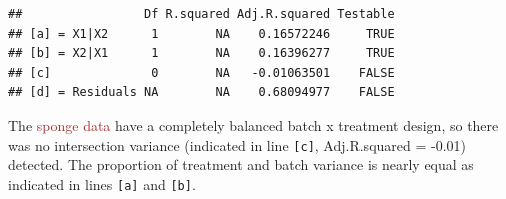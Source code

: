 \documentclass[
]{book}
\newenvironment{Shaded}{\begin{snugshade}}{\end{snugshade}}
\newcommand{\AttributeTok}[1]{\textcolor[rgb]{0.77,0.63,0.00}{#1}}
\newcommand{\CommentTok}[1]{\textcolor[rgb]{0.56,0.35,0.01}{\textit{#1}}}
\newcommand{\ConstantTok}[1]{\textcolor[rgb]{0.00,0.00,0.00}{#1}}
\newcommand{\FunctionTok}[1]{\textcolor[rgb]{0.00,0.00,0.00}{#1}}
\newcommand{\NormalTok}[1]{#1}
\newcommand{\OtherTok}[1]{\textcolor[rgb]{0.56,0.35,0.01}{#1}}
\newcommand{\SpecialCharTok}[1]{\textcolor[rgb]{0.00,0.00,0.00}{#1}}
\newcommand{\StringTok}[1]{\textcolor[rgb]{0.31,0.60,0.02}{#1}}
\begin{document}
\begin{Shaded}
\end{Shaded}

\begin{verbatim}
##                 Df R.squared Adj.R.squared Testable
## [a] = X1|X2      1        NA    0.16572246     TRUE
## [b] = X2|X1      1        NA    0.16396277     TRUE
## [c]              0        NA   -0.01063501    FALSE
## [d] = Residuals NA        NA    0.68094977    FALSE
\end{verbatim}

The \textcolor{brown}{sponge data} have a completely balanced batch x treatment design, so there was no intersection variance (indicated in line \texttt{{[}c{]}}, Adj.R.squared = -0.01) detected. The proportion of treatment and batch variance is nearly equal as indicated in lines \texttt{{[}a{]}} and \texttt{{[}b{]}}.
\end{document}
